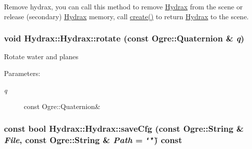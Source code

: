 Remove hydrax, you can call this method to remove \hyperlink{class_hydrax_1_1_hydrax}{Hydrax} from the scene or release (secondary) \hyperlink{class_hydrax_1_1_hydrax}{Hydrax} memory, call \hyperlink{class_hydrax_1_1_hydrax_af840e19208614533a6b344e32965ee2}{create()} to return \hyperlink{class_hydrax_1_1_hydrax}{Hydrax} to the scene. \hypertarget{class_hydrax_1_1_hydrax_35958e296923f17c5eab19840d3711e2}{
\subsubsection[{rotate}]{\setlength{\rightskip}{0pt plus 5cm}void Hydrax::Hydrax::rotate (const Ogre::Quaternion \& {\em q})}}
\label{class_hydrax_1_1_hydrax_35958e296923f17c5eab19840d3711e2}


Rotate water and planes \begin{Desc}
\item[Parameters:]
\begin{description}
\item[{\em q}]const Ogre::Quaternion\& \end{description}
\end{Desc}
\hypertarget{class_hydrax_1_1_hydrax_3a812b0ad6d06bdfaa961a1e2caa7eee}{
\subsubsection[{saveCfg}]{\setlength{\rightskip}{0pt plus 5cm}const bool Hydrax::Hydrax::saveCfg (const Ogre::String \& {\em File}, \/  const Ogre::String \& {\em Path} = {\tt \char`\"{}\char`\"{}}) const}}
\label{class_hydrax_1_1_hydrax_3a812b0ad6d06bdfaa961a1e2caa7eee}


